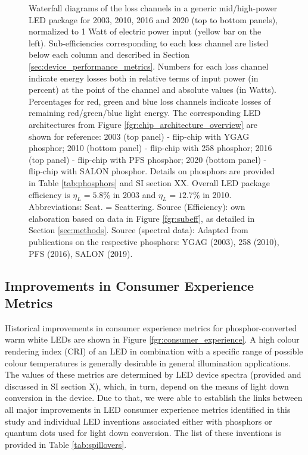\documentclass[twoside,twocolumn,9pt]{article}
\begin{document}
\begin{figure}[h!]
 \caption{Waterfall diagrams of the loss channels in a generic mid/high-power LED package for 2003, 2010, 2016 and 2020 (top to bottom panels), normalized to 1 Watt of electric power input (yellow bar on the left). Sub-efficiencies corresponding to each loss channel are listed below each column and described in Section \ref{sec:device_performance_metrics}. Numbers for each loss channel indicate energy losses both in relative terms of input power (in percent) at the point of the channel and absolute values (in Watts). Percentages for red, green and blue loss channels indicate losses of remaining red/green/blue light energy. The corresponding LED architectures from Figure \ref{fgr:chip_architecture_overview} are shown for reference: 2003 (top panel) - flip-chip with YGAG phosphor; 2010 (bottom panel) - flip-chip with 258 phosphor; 2016 (top panel) - flip-chip with PFS phosphor; 2020 (bottom panel) - flip-chip with SALON phosphor. Details on phosphors are provided in Table \ref{tab:phosphors} and SI section XX. Overall LED package efficiency is $\eta_L = 5.8\%$ in 2003 and $\eta_L = 12.7\%$ in 2010. Abbreviations: Scat. = Scattering. Source (Efficiency): own elaboration based on data in Figure \ref{fgr:subeff}, as detailed in Section \ref{sec:methods}. Source (spectral data): Adapted from publications on the respective phosphors: YGAG (2003)\cite{Mueller2002}, 258 (2010)\cite{MuellerMach2005}, PFS (2016)\cite{Murphy2015}, SALON (2019)\cite{Hoerder2019}.}
 \label{fgr:waterfall}
\end{figure}

\subsection{Improvements in Consumer Experience Metrics}

Historical improvements in consumer experience metrics for phosphor-converted warm white LEDs are shown in Figure \ref{fgr:consumer_experience}. A high colour rendering index (CRI) of an LED in combination with a specific range of possible colour temperatures is generally desirable in general illumination applications. The values of these metrics are determined by LED device spectra (provided and discussed in SI section X), which, in turn, depend on the means of light down conversion in the device. Due to that, we were able to establish the links between all major improvements in LED consumer experience metrics identified in this study and individual LED inventions associated either with phosphors or quantum dots used for light down conversion. The list of these inventions is provided in Table \ref{tab:spillovers}. 
\end{document}
